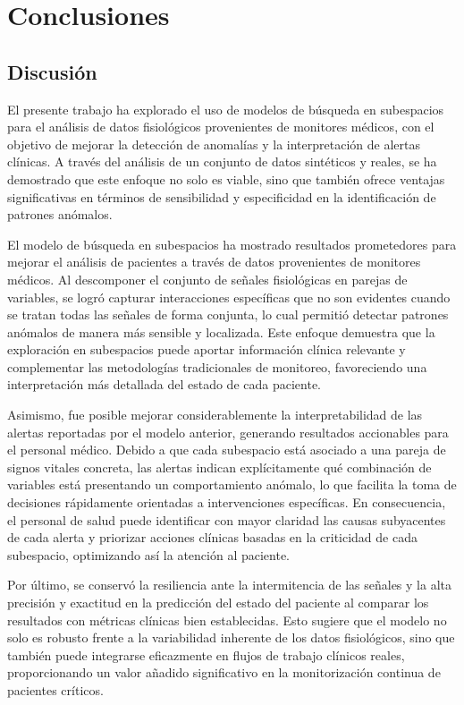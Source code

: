 \chapter{Conclusiones}

\section{Discusión}

El presente trabajo ha explorado el uso de modelos de búsqueda en subespacios para el análisis de datos fisiológicos provenientes de monitores médicos, con el objetivo de mejorar la detección de anomalías y la interpretación de alertas clínicas. A través del análisis de un conjunto de datos sintéticos y reales, se ha demostrado que este enfoque no solo es viable, sino que también ofrece ventajas significativas en términos de sensibilidad y especificidad en la identificación de patrones anómalos.

El modelo de búsqueda en subespacios ha mostrado resultados prometedores para mejorar el análisis de pacientes a través de datos provenientes de monitores médicos. Al descomponer el conjunto de señales fisiológicas en parejas de variables, se logró capturar interacciones específicas que no son evidentes cuando se tratan todas las señales de forma conjunta, lo cual permitió detectar patrones anómalos de manera más sensible y localizada. Este enfoque demuestra que la exploración en subespacios puede aportar información clínica relevante y complementar las metodologías tradicionales de monitoreo, favoreciendo una interpretación más detallada del estado de cada paciente.

Asimismo, fue posible mejorar considerablemente la interpretabilidad de las alertas reportadas por el modelo anterior, generando resultados accionables para el personal médico. Debido a que cada subespacio está asociado a una pareja de signos vitales concreta, las alertas indican explícitamente qué combinación de variables está presentando un comportamiento anómalo, lo que facilita la toma de decisiones rápidamente orientadas a intervenciones específicas. En consecuencia, el personal de salud puede identificar con mayor claridad las causas subyacentes de cada alerta y priorizar acciones clínicas basadas en la criticidad de cada subespacio, optimizando así la atención al paciente.

Por último, se conservó la resiliencia ante la intermitencia de las señales y la alta precisión y exactitud en la predicción del estado del paciente al comparar los resultados con métricas clínicas bien establecidas. Esto sugiere que el modelo no solo es robusto frente a la variabilidad inherente de los datos fisiológicos, sino que también puede integrarse eficazmente en flujos de trabajo clínicos reales, proporcionando un valor añadido significativo en la monitorización continua de pacientes críticos.

